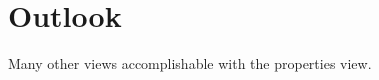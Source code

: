 \documentclass[preview]{standalone}
\begin{document}
\section{Outlook}
Many other views accomplishable with the properties view.
\end{document}
